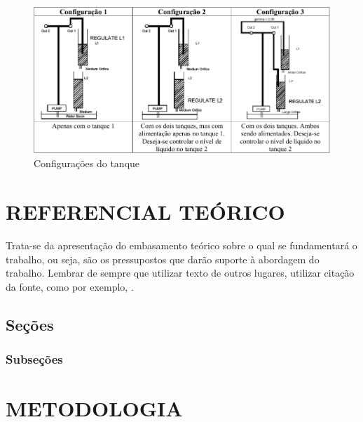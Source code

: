 \documentclass[a4paper,12pt]{article}
\begin{document}
\begin{flushleft}
\begin{figure}[h]
	\centering
	\includegraphics[scale=0.40]{./imagens/configuracoes-tanque.png}
	\caption{Configurações do tanque}
\end{figure}

\end{flushleft}

\pagebreak


\thispagestyle{main}
\section{REFERENCIAL TEÓRICO}



Trata-se da apresentação do embasamento teórico sobre o qual se fundamentará
o trabalho, ou seja, são os pressupostos que darão suporte à abordagem do trabalho.
Lembrar de sempre que utilizar texto de outros lugares, utilizar citação da fonte, como por exemplo, \cite{LATEX04}.

\subsection{Seções}

\subsubsection{Subseções}

\newpage


\thispagestyle{main}

\section{METODOLOGIA}
\end{document}
